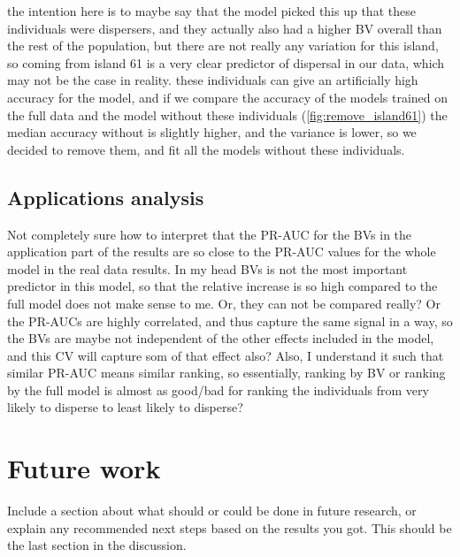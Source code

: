 the intention here is to maybe say that the model picked this up that these individuals were dispersers, and they actually also had a higher BV overall than the rest of the population, but there are not really any variation for this island, so coming from island 61 is a very clear predictor of dispersal in our data, which may not be the case in reality. these individuals can give an artificially high accuracy for the model, and if we compare the accuracy of the models trained on the full data and the model without these individuals (\autoref{fig:remove_island61}) the median accuracy without is slightly higher, and the variance is lower, so we decided to remove them, and fit all the models without these individuals. 

\subsection{Applications analysis}

Not completely sure how to interpret that the PR-AUC for the BVs in the application part of the results are so close to the PR-AUC values for the whole model in the real data results. In my head BVs is not the most important predictor in this model, so that the relative increase is so high compared to the full model does not make sense to me. Or, they can not be compared really? Or the PR-AUCs are highly correlated, and thus capture the same signal in a way, so the BVs are maybe not independent of the other effects included in the model, and this CV will capture som of that effect also? Also, I understand it such that similar PR-AUC means similar ranking, so essentially, ranking by BV or ranking by the full model is almost as good/bad for ranking the individuals from very likely to disperse to least likely to disperse? 

\section{Future work}

Include a section about what should or could be done in future research, or explain any recommended next steps based on the results you got. This should be the last section in the discussion.
